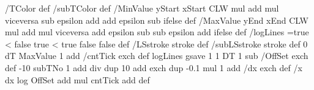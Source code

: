 {{{      /TColor {
        \ifis@yAxis\pst@usecolor\psk@ytickcolor
        \else\pst@usecolor\psk@xtickcolor\fi\space } def
      /subTColor {
        \ifis@yAxis\pst@usecolor\psk@ysubtickcolor
        \else\pst@usecolor\psk@xsubtickcolor\fi\space } def
      /MinValue { \ifis@yAxis yStart \else xStart \fi
        \ifx\psk@arrowA\@empty\else 
          \psk@arrowsize\space CLW mul add \psk@arrowlength\space mul 
           viceversa { sub epsilon add }{ add epsilon sub } ifelse \fi } def
      /MaxValue { \ifis@yAxis yEnd \else xEnd \fi 
        \ifx\psk@arrowB\@empty\else
          \psk@arrowsize\space CLW mul add \psk@arrowlength\space mul 
           viceversa { add epsilon sub }{ sub epsilon add } ifelse \fi } def
      /logLines {
        \ifnum\psk@logLines=\z@ true \else         %
          \ifnum\psk@logLines<\tw@                 %
            \ifis@yAxis false \else true \fi       %
          \else
            \ifnum\psk@logLines<\thr@@             %
              \ifis@yAxis true \else false \fi     %
            \else 
              false                                %
            \fi
          \fi
        \fi
      } def
      /LSstroke {                                  %
        \ifis@yAxis {}
        \else       {}\fi 
        stroke} def
      /subLSstroke {                               %
        \ifis@yAxis {}
        \else       {}\fi 
        stroke} def
      0 dT MaxValue 1 add {                        %
        /cntTick exch def                          %
        logLines {                                 %
          gsave
          1 1 DT {
           1 sub /OffSet exch def
          -10 subTNo 1 add div dup 10 add exch dup -0.1 mul 1 add {                   %
            /dx exch def                           %
            /x dx log OffSet add \ifis@yAxis\pst@number\psyunit\else\pst@number\psxunit\fi\space mul cntTick add def       %
}}}}}}}
